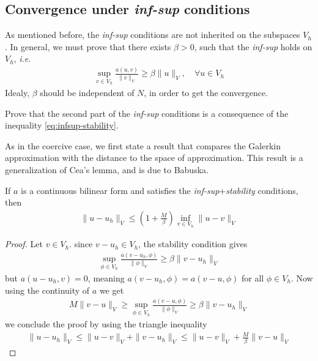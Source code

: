 \subsection{Convergence under \textit{inf-sup} conditions}
As mentioned before, the \textit{inf-sup} conditions are not inherited on the subspaces $V_h$. In general, we must prove that there exists $\beta > 0$, such that the \textit{inf-sup} holds on $V_h$, \textit{i.e.}
\begin{align}
   \sup\limits_{v \in V_h} \frac{a(u,v)}{\| v \|_V} \geq \beta \| u \|_V, \quad \forall u \in V_h
   \label{eq:infsup-stability}
\end{align}
Idealy, $\beta$ should be independent of $N$, in order to get the convergence.
\begin{exercise}
  Prove that the second part of the \textit{inf-sup} conditions is a consequence of the inequality \eqref{eq:infsup-stability}.
\end{exercise}
As in the coercive case, we first state a result that compares the Galerkin approximation with the distance to the space of approximation. This result is a generalization of Cea's lemma, and is due to Babuska.
\begin{lemma}[Babuska]
  If $a$ is a continuous bilinear form and satisfies the \textit{inf-sup}+\textit{stability} conditions, then
  \begin{align}
    \| u-u_h \|_V \leq \left( 1 + \frac{M}{\beta} \right) \inf\limits_{v \in V_h} \| u-v \|_V
    \label{eq:babuska-ineq}
  \end{align}
  \label{lemma:babuska}
\end{lemma}
\begin{proof}
  Let $v \in V_h$. 
  since $v-u_h \in V_h$, the stability condition gives
  \begin{align*}
     \sup\limits_{\phi \in V_h} \frac{a(v-u_h,\phi)}{\| \phi \|_V} \geq \beta \| v-u_h \|_V
  \end{align*}
  but $a(u-u_h, v) = 0$, meaning $a(v-u_h, \phi) = a(v-u, \phi)$ for all $\phi \in V_h$. Now using the continuity of $a$ we get
  \begin{align*}
     M \| v-u \|_V \geq \sup\limits_{\phi \in V_h} \frac{a(v-u,\phi)}{\| \phi \|_V} \geq \beta \| v-u_h \|_V
  \end{align*}
  we conclude the proof by using the triangle inequality
  \begin{align*}
    \| u-u_h \|_V \leq \| u-v \|_V + \| v-u_h \|_V  \leq  \| u-v \|_V + \frac{M}{\beta}\| v-u \|_V 
  \end{align*}

\end{proof}
